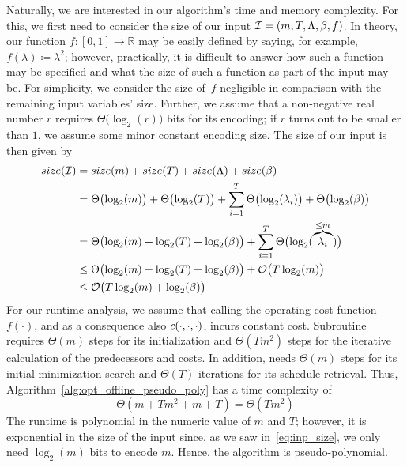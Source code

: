 Naturally, we are interested in our algorithm's time and memory complexity.
For this, we first need to consider the size of our input $\mathcal{I}=(m,T,\Lambda,\beta,f)$. In theory, our function $f:[0,1]\rightarrow \mathbb{R}$ may be easily defined by saying, for example, $f(\lambda)\coloneqq \lambda^2$; however, practically, it is difficult to answer how such a function may be specified and what the size of such a function as part of the input may be. For simplicity, we consider the size of~$f$ negligible in comparison with the remaining input variables' size. Further, we assume that a non-negative real number $r$ requires $\Theta\bigl(\log_2(r)\bigr)$ bits for its encoding; if $r$ turns out to be smaller than $1$, we assume some minor constant encoding size. The size of our input is then given by
\begin{align}
	size(\mathcal{I})&=size(m)+size(T)+size(\Lambda)+size(\beta)\nonumber\\
	&=\Theta\bigl(\log_2(m)\bigr)+\Theta\bigl(\log_2(T)\bigr)+\sum\limits_{i=1}^T \Theta\bigl(\log_2(\lambda_i)\bigr)+\Theta\bigl(\log_2(\beta)\bigr)\nonumber\\
	&=\Theta\bigl(\log_2(m)+\log_2(T)+\log_2(\beta)\bigr)+\sum\limits_{i=1}^T \Theta\bigl(\log_2(\overbrace{\lambda_i}^{\le m})\bigr)\nonumber\\
	&\le\Theta\bigl(\log_2(m)+\log_2(T)+\log_2(\beta)\bigr)+\mathcal{O}\bigl(T\log_2(m)\bigr)\nonumber\\
	&\le\mathcal{O}\bigl(T\log_2(m)+\log_2(\beta)\bigr)\label{eq:inp_size}
\end{align}
For our runtime analysis, we assume that calling the operating cost function $f(\cdot)$, and as a consequence also $c(\cdot,\cdot,\cdot)$, incurs constant cost. Subroutine  requires $\Theta(m)$ steps for its initialization and $\Theta(Tm^2)$ steps for the iterative calculation of the predecessors and costs. In addition,  needs $\Theta(m)$ steps for its initial minimization search and $\Theta(T)$ iterations for its schedule retrieval. Thus, Algorithm~\ref{alg:opt_offline_pseudo_poly} has a time complexity of
\begin{equation*}
	\Theta(m+Tm^2+m+T)=\Theta(Tm^2)
\end{equation*}
The runtime is polynomial in the numeric value of $m$ and $T$; however, it is exponential in the size of the input since, as we saw in~\eqref{eq:inp_size}, we only need $\log_2(m)$ bits to encode $m$. Hence, the algorithm is pseudo-polynomial.

